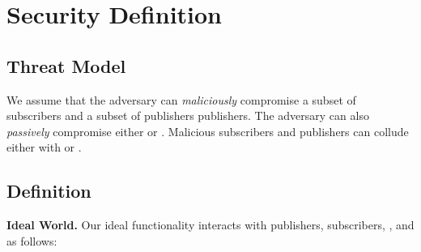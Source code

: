 \section{Security Definition}
\label{sec:definition}


\subsection{Threat Model} We assume that the adversary can \emph{maliciously}
compromise a subset of subscribers and a subset of publishers publishers. The
adversary can also \emph{passively} compromise either \broker or \garbler.
Malicious subscribers and publishers can collude either with \garbler or
\broker.

\subsection{Definition}


\noindent\textbf{Ideal World.}
Our ideal functionality \F interacts with publishers, subscribers, \broker, and
\garbler as follows:

